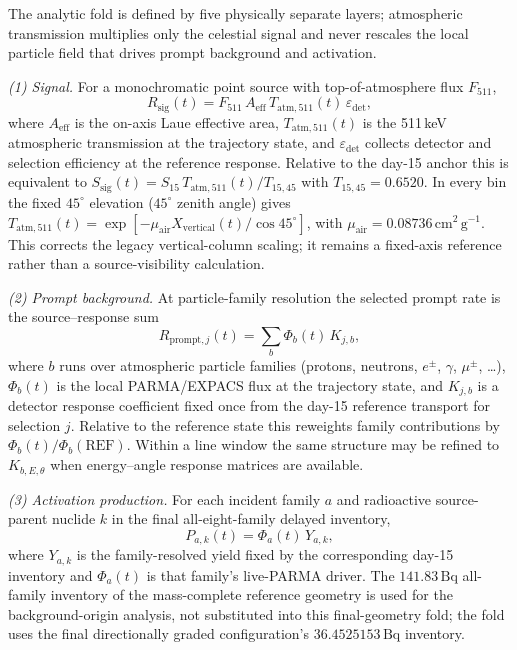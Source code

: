 \documentclass[11pt]{article}
\begin{document}
The analytic fold is defined by five physically separate layers; atmospheric transmission multiplies only the celestial signal and never rescales the local particle field that drives prompt background and activation.

\emph{(1) Signal.} For a monochromatic point source with top-of-atmosphere flux $F_{511}$,
\begin{equation}
  R_{\mathrm{sig}}(t)=F_{511}\,A_{\mathrm{eff}}\,T_{\mathrm{atm},511}(t)\,\varepsilon_{\mathrm{det}},
  \label{eq:mission_signal}
\end{equation}
where $A_{\mathrm{eff}}$ is the on-axis Laue effective area, $T_{\mathrm{atm},511}(t)$ is the 511\,keV atmospheric transmission at the trajectory state, and $\varepsilon_{\mathrm{det}}$ collects detector and selection efficiency at the reference response. Relative to the day-15 anchor this is equivalent to
$S_{\mathrm{sig}}(t)=S_{15}\,T_{\mathrm{atm},511}(t)/T_{15,45}$ with
$T_{15,45}=0.6520$. In every bin the fixed $45^\circ$ elevation
($45^\circ$ zenith angle) gives
$T_{\mathrm{atm},511}(t)=\exp[-\mu_{\mathrm{air}}X_{\mathrm{vertical}}(t)/\cos45^\circ]$,
with $\mu_{\mathrm{air}}=0.08736\,\mathrm{cm^2\,g^{-1}}$. This corrects the
legacy vertical-column scaling; it remains a fixed-axis reference rather than a
source-visibility calculation.

\emph{(2) Prompt background.} At particle-family resolution the selected prompt rate is the source--response sum
\begin{equation}
  R_{\mathrm{prompt},j}(t)=\sum_{b}\Phi_{b}(t)\,K_{j,b},
  \label{eq:prompt_source_response}
\end{equation}
where $b$ runs over atmospheric particle families (protons, neutrons, $e^{\pm}$, $\gamma$, $\mu^{\pm}$, \ldots), $\Phi_{b}(t)$ is the local PARMA/EXPACS flux at the trajectory state, and $K_{j,b}$ is a detector response coefficient fixed once from the day-15 reference transport for selection $j$. Relative to the reference state this reweights family contributions by $\Phi_{b}(t)/\Phi_{b}(\mathrm{REF})$. Within a line window the same structure may be refined to $K_{b,E,\theta}$ when energy--angle response matrices are available.

\emph{(3) Activation production.} For each incident family $a$ and radioactive
source-parent nuclide $k$ in the final all-eight-family delayed inventory,
\begin{equation}
  P_{a,k}(t)=\Phi_{a}(t)\,Y_{a,k},
  \label{eq:activation_production}
\end{equation}
where $Y_{a,k}$ is the family-resolved yield fixed by the corresponding day-15
inventory and $\Phi_a(t)$ is that family's live-PARMA driver. The $141.83\,\mathrm{Bq}$
all-family inventory of the mass-complete reference geometry is used for the
background-origin analysis, not substituted into this final-geometry fold; the
fold uses the final directionally graded configuration's
$36.4525153\,\mathrm{Bq}$ inventory.
\end{document}

